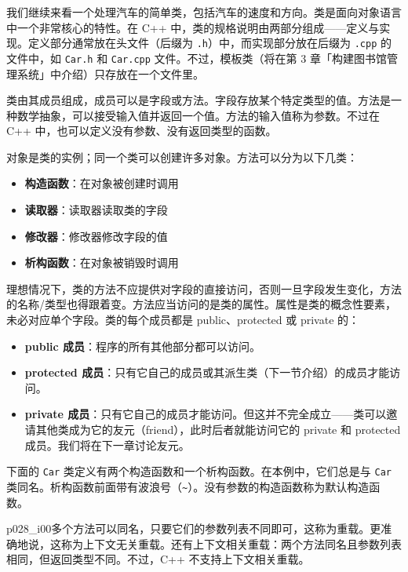 我们继续来看一个处理汽车的简单类，包括汽车的速度和方向。类是面向对象语言中一个非常核心的特性。在 C++ 中，类的规格说明由两部分组成——定义与实现。定义部分通常放在头文件（后缀为 \texttt{.h}）中，而实现部分放在后缀为 \texttt{.cpp} 的文件中，如 \texttt{Car.h} 和 \texttt{Car.cpp} 文件。不过，模板类（将在第 3 章「构建图书馆管理系统」中介绍）只存放在一个文件里。

类由其成员组成，成员可以是字段或方法。字段存放某个特定类型的值。方法是一种数学抽象，可以接受输入值并返回一个值。方法的输入值称为参数。不过在 C++ 中，也可以定义没有参数、没有返回类型的函数。

对象是类的实例；同一个类可以创建许多对象。方法可以分为以下几类：

\begin{itemize}
\item \textbf{构造函数}：在对象被创建时调用
\item \textbf{读取器}：读取器读取类的字段
\item \textbf{修改器}：修改器修改字段的值
\item \textbf{析构函数}：在对象被销毁时调用
\end{itemize}

理想情况下，类的方法不应提供对字段的直接访问，否则一旦字段发生变化，方法的名称/类型也得跟着变。方法应当访问的是类的属性。属性是类的概念性要素，未必对应单个字段。类的每个成员都是 public、protected 或 private 的：

\begin{itemize}
\item \textbf{public 成员}：程序的所有其他部分都可以访问。
\item \textbf{protected 成员}：只有它自己的成员或其派生类（下一节介绍）的成员才能访问。
\item \textbf{private 成员}：只有它自己的成员才能访问。但这并不完全成立——类可以邀请其他类成为它的友元（friend），此时后者就能访问它的 private 和 protected 成员。我们将在下一章讨论友元。
\end{itemize}

下面的 \texttt{Car} 类定义有两个构造函数和一个析构函数。在本例中，它们总是与 \texttt{Car} 类同名。析构函数前面带有波浪号（\texttt{\textasciitilde}）。没有参数的构造函数称为默认构造函数。

\begin{myNotic}{p028_i00}{多个方法可以同名，只要它们的参数列表不同即可，这称为重载。更准确地说，这称为上下文无关重载。还有上下文相关重载：两个方法同名且参数列表相同，但返回类型不同。不过，C++ 不支持上下文相关重载。}
\end{myNotic}

